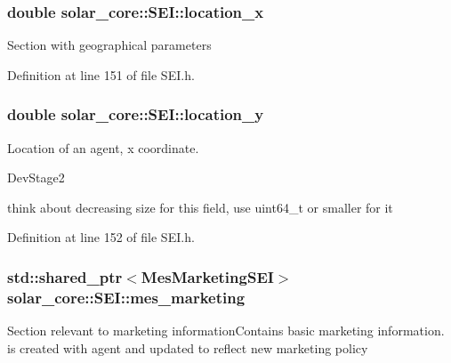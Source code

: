 \hypertarget{classsolar__core_1_1_s_e_i_a3de17f788667889770edaf7dc0fc054d}{}
\subsubsection[{location\+\_\+x}]{\setlength{\rightskip}{0pt plus 5cm}double solar\+\_\+core\+::\+S\+E\+I\+::location\+\_\+x}\label{classsolar__core_1_1_s_e_i_a3de17f788667889770edaf7dc0fc054d}
Section with geographical parameters 

Definition at line 151 of file S\+E\+I.\+h.

\hypertarget{classsolar__core_1_1_s_e_i_a5fc331197d08788392c3af1903f25763}{}
\subsubsection[{location\+\_\+y}]{\setlength{\rightskip}{0pt plus 5cm}double solar\+\_\+core\+::\+S\+E\+I\+::location\+\_\+y}\label{classsolar__core_1_1_s_e_i_a5fc331197d08788392c3af1903f25763}
Location of an agent, x coordinate.\begin{DoxyRefDesc}{Dev\+Stage2}
\item[\hyperlink{_dev_stage2__DevStage2000018}{Dev\+Stage2}]think about decreasing size for this field, use uint64\+\_\+t or smaller for it \end{DoxyRefDesc}


Definition at line 152 of file S\+E\+I.\+h.

\hypertarget{classsolar__core_1_1_s_e_i_ad5326c45ccd4a5512a6c0a296656264d}{}
\subsubsection[{mes\+\_\+marketing}]{\setlength{\rightskip}{0pt plus 5cm}std\+::shared\+\_\+ptr$<${\bf Mes\+Marketing\+S\+E\+I}$>$ solar\+\_\+core\+::\+S\+E\+I\+::mes\+\_\+marketing\hspace{0.3cm}{\ttfamily [protected]}}\label{classsolar__core_1_1_s_e_i_ad5326c45ccd4a5512a6c0a296656264d}
Section relevant to marketing information\+Contains basic marketing information. is created with agent and updated to reflect new marketing policy 

